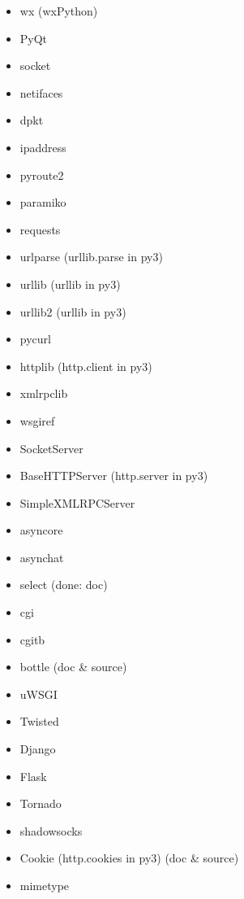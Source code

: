 \documentclass{article}
\begin{document}
\begin{enumerate}
\begin{itemize}
            \item wx (wxPython)
            \item PyQt

            \item socket
            \item netifaces
            \item dpkt
            \item ipaddress
            \item pyroute2
            \item paramiko
            \item requests
            \item urlparse (urllib.parse in py3)
            \item urllib (urllib in py3)
            \item urllib2 (urllib in py3)
            \item pycurl
            \item httplib (http.client in py3)
            \item xmlrpclib
            \item wsgiref
            \item SocketServer
            \item BaseHTTPServer (http.server in py3)
            \item SimpleXMLRPCServer
            \item asyncore
            \item asynchat
            \item select (done: doc)
            \item cgi
            \item cgitb
            \item bottle (doc & source)
            \item uWSGI
            \item Twisted
            \item Django
            \item Flask
            \item Tornado
            \item shadowsocks
            \item Cookie (http.cookies in py3) (doc & source)

            \item mimetype


\end{itemize}
\end{enumerate}
\end{document}
